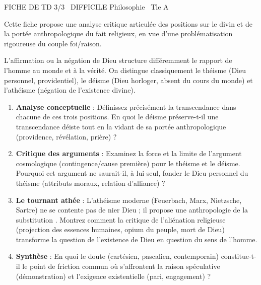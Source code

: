 \documentclass[11pt]{article}
\begin{document}
\begin{tcolorbox}[enhanced,colback=popink,colframe=popink,arc=10pt,boxrule=0pt,left=12pt,right=12pt,top=9pt,bottom=9pt]
{\color{white}\popxbold\small FICHE DE TD 3/3 \textbullet\ DIFFICILE \hfill Philosophie \textbullet\ Tle A\par}
\end{tcolorbox}
\vspace{4pt}
Cette fiche propose une analyse critique articulée des positions sur le divin et de la portée anthropologique du fait religieux, en vue d'une problématisation rigoureuse du couple foi/raison.

\begin{exercice}
L'affirmation ou la négation de Dieu structure différemment le rapport de l'homme au monde et à la vérité. On distingue classiquement le théisme (Dieu personnel, providentiel), le déisme (Dieu horloger, absent du cours du monde) et l'athéisme (négation de l'existence divine).
\begin{enumerate}
    \item \textbf{Analyse conceptuelle} : Définissez précisément la \og transcendance \fg{} dans chacune de ces trois positions. En quoi le déisme préserve-t-il une transcendance \og déiste \fg{} tout en la vidant de sa portée anthropologique (providence, révélation, prière) ?
    \item \textbf{Critique des arguments} : Examinez la force et la limite de l'argument \og cosmologique \fg{} (contingence/cause première) pour le théisme et le déisme. Pourquoi cet argument ne saurait-il, à lui seul, fonder le Dieu personnel du théisme (attributs moraux, relation d'alliance) ?
    \item \textbf{Le tournant athée} : L'athéisme moderne (Feuerbach, Marx, Nietzsche, Sartre) ne se contente pas de nier Dieu ; il propose une \og anthropologie de la substitution \fg{}. Montrez comment la critique de l'aliénation religieuse (projection des essences humaines, opium du peuple, mort de Dieu) transforme la question de l'existence de Dieu en question du sens de l'homme.
    \item \textbf{Synthèse} : En quoi le \og doute \fg{} (cartésien, pascalien, contemporain) constitue-t-il le point de friction commun où s'affrontent la raison spéculative (démonstration) et l'exigence existentielle (pari, engagement) ?
\end{enumerate}
\end{exercice}
\end{document}

